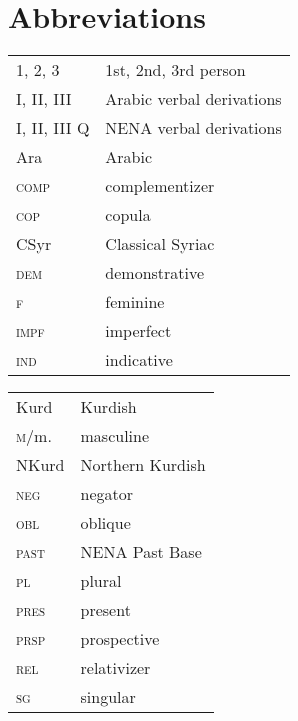 \documentclass[output=paper]{langsci/langscibook}
\begin{document}
\section*{Abbreviations}
\begin{tabularx}{.45\textwidth}{lQ}
\textsc{1, 2, 3} & 1st, 2nd, 3rd person \\
I, II, III   & Arabic verbal derivations\\
I, II, III Q    & NENA verbal derivations\\
Ara            & Arabic\\
\textsc{comp}    & complementizer\\
\textsc{cop}     & copula\\
CSyr           & Classical Syriac\\
\textsc{dem}     & demonstrative \\
\textsc{f}    & feminine\\
\textsc{impf}   & imperfect \\
\textsc{ind}     & indicative\\
\end{tabularx}
\begin{tabularx}{.45\textwidth}{lQ}
Kurd           & Kurdish\\
\textsc{m}/m.    & masculine\\
NKurd        & Northern Kurdish \\ 
\textsc{neg}    & negator\\
\textsc{obl}     & oblique\\
\textsc{past}   & NENA Past Base\\
\textsc{pl}  & plural\\
\textsc{pres}    & present \\
\textsc{prsp}    & prospective \\
\textsc{rel}     & relativizer\\
\textsc{sg}  & singular

\end{tabularx}
\end{document}
